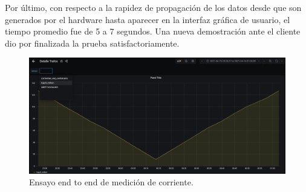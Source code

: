 Por \'{u}ltimo, con respecto a la rapidez de propagaci\'{o}n de los datos desde que son generados por el hardware hasta aparecer en la interfaz gráfica de usuario, el tiempo promedio fue de 5 a 7 segundos. Una nueva demostraci\'{o}n ante el cliente dio por finalizada la prueba satisfactoriamente.
\vspace{200px}
\begin{figure}[h!]
	\centering
	\includegraphics[width=1.0\linewidth]{Figures/captura_historico_dropdown}
	\caption{Ensayo end to end de medici\'{o}n de corriente.}
	\label{fig:capturahistoricodropdown}
\end{figure}\\